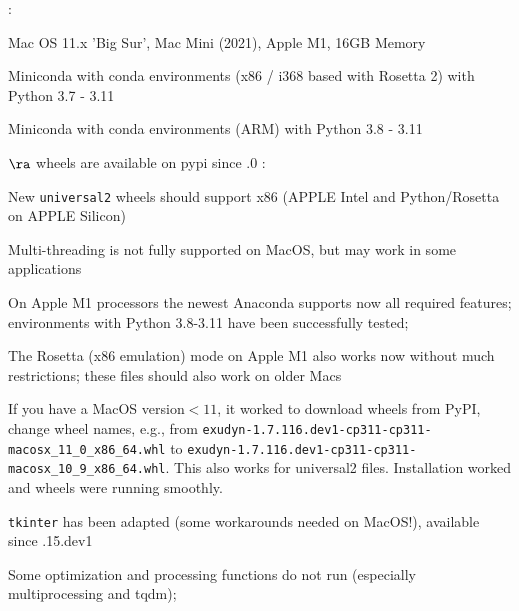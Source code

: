 \noindent {}:
\bi
  \item Mac OS 11.x 'Big Sur', Mac Mini (2021), Apple M1, 16GB Memory
  \item Miniconda with conda environments (x86 / i368 based with Rosetta 2) with Python 3.7 - 3.11
  \item Miniconda with conda environments (ARM) with Python 3.8 - 3.11
  \item[] $\ra$ wheels are available on pypi since .0 
\ei
\noindent {}:
\bi
  \item New \texttt{universal2} wheels should support x86 (APPLE Intel and Python/Rosetta on APPLE Silicon)
  \item Multi-threading is not fully supported on MacOS, but may work in some applications
  \item On Apple M1 processors the newest Anaconda supports now all required features; environments with Python 3.8-3.11 have been successfully tested;
  \item The Rosetta (x86 emulation) mode on Apple M1 also works now without much restrictions; these files should also work on older Macs
  \item If you have a MacOS version$<11$, it worked to download wheels from PyPI, change wheel names, e.g., from \texttt{exudyn-1.7.116.dev1-cp311-cp311-macosx\_11\_0\_x86\_64.whl} to \texttt{exudyn-1.7.116.dev1-cp311-cp311-macosx\_10\_9\_x86\_64.whl}. This also works for universal2 files. Installation worked and wheels were running smoothly.
  \item \texttt{tkinter} has been adapted (some workarounds needed on MacOS!), available since .15.dev1
  \item Some optimization and processing functions do not run (especially multiprocessing and tqdm); 
\ei

